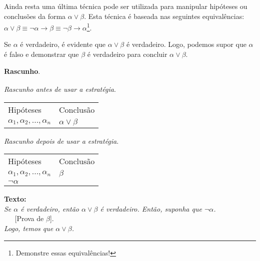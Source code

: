 Ainda resta uma última técnica pode ser utilizada para manipular hipóteses ou
conclusões da forma $\alpha\lor\beta$. Esta técnica é baseada nas
seguintes equivalências: $\alpha\lor\beta \equiv \neg \alpha \to \beta
\equiv \neg \beta \to \alpha$\footnote{Demonstre essas equivalências!}.
\begin{ProofStrategy}
Se $\alpha$ é verdadeiro, é evidente que $\alpha\lor\beta$ é
verdadeiro. Logo, podemos supor que $\alpha$ é falso e demonstrar que
$\beta$ é verdadeiro para concluir $\alpha\lor\beta$.
\begin{flushleft}
\textbf{Rascunho}.\\
\verb| |\\

\textit{Rascunho antes de usar a estratégia}.
\verb| |\\
\begin{tabular}{ll}
Hipóteses & Conclusão \\
$\alpha_1,\alpha_2,...,\alpha_n$ & $\alpha\lor\beta$\\
\end{tabular}

\textit{Rascunho depois de usar a estratégia}.
\verb| |\\
\begin{tabular}{ll}
Hipóteses & Conclusão \\
$\alpha_1,\alpha_2,...,\alpha_n$ & $\beta$\\
$\neg \alpha$ & \\
\end{tabular}
\end{flushleft}
\begin{flushleft}
\textbf{Texto:}\\
\textit{Se $\alpha$ é verdadeiro, então $\alpha\lor\beta$ é
  verdadeiro. Então, suponha que $\neg\alpha$.}\\
\verb|   |[Prova de $\beta$].\\
\textit{Logo, temos que $\alpha\lor\beta$.}
\end{flushleft}
\end{ProofStrategy}
